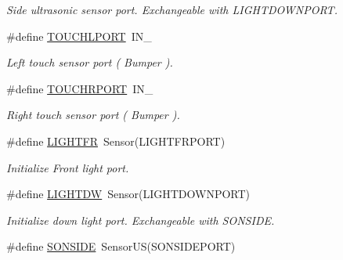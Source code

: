\begin{DoxyCompactItemize}
\begin{DoxyCompactList}\small\item\em Side ultrasonic sensor port. Exchangeable with LIGHTDOWNPORT. \item\end{DoxyCompactList}\item 
\hypertarget{reactor_8nxc_a867a2479cd5e144bc98b3e24bd48a79c}{
\#define \hyperlink{reactor_8nxc_a867a2479cd5e144bc98b3e24bd48a79c}{TOUCHLPORT}~IN\_}
\label{reactor_8nxc_a867a2479cd5e144bc98b3e24bd48a79c}

\begin{DoxyCompactList}\small\item\em Left touch sensor port ( Bumper ). \item\end{DoxyCompactList}\item 
\hypertarget{reactor_8nxc_ac16330478e7b003e00f37e90e0c5bdf6}{
\#define \hyperlink{reactor_8nxc_ac16330478e7b003e00f37e90e0c5bdf6}{TOUCHRPORT}~IN\_}
\label{reactor_8nxc_ac16330478e7b003e00f37e90e0c5bdf6}

\begin{DoxyCompactList}\small\item\em Right touch sensor port ( Bumper ). \item\end{DoxyCompactList}\item 
\hypertarget{reactor_8nxc_a26fd581a2d8a8f58a30535495c8d0843}{
\#define \hyperlink{reactor_8nxc_a26fd581a2d8a8f58a30535495c8d0843}{LIGHTFR}~Sensor(LIGHTFRPORT)}
\label{reactor_8nxc_a26fd581a2d8a8f58a30535495c8d0843}

\begin{DoxyCompactList}\small\item\em Initialize Front light port. \item\end{DoxyCompactList}\item 
\hypertarget{reactor_8nxc_aadf3c356fd812224ab384f9780155c1a}{
\#define \hyperlink{reactor_8nxc_aadf3c356fd812224ab384f9780155c1a}{LIGHTDW}~Sensor(LIGHTDOWNPORT)}
\label{reactor_8nxc_aadf3c356fd812224ab384f9780155c1a}

\begin{DoxyCompactList}\small\item\em Initialize down light port. Exchangeable with SONSIDE. \item\end{DoxyCompactList}\item 
\hypertarget{reactor_8nxc_aec1d71dea61f39acce761840c4ce0d27}{
\#define \hyperlink{reactor_8nxc_aec1d71dea61f39acce761840c4ce0d27}{SONSIDE}~SensorUS(SONSIDEPORT)}
\label{reactor_8nxc_aec1d71dea61f39acce761840c4ce0d27}


\end{DoxyCompactItemize}
